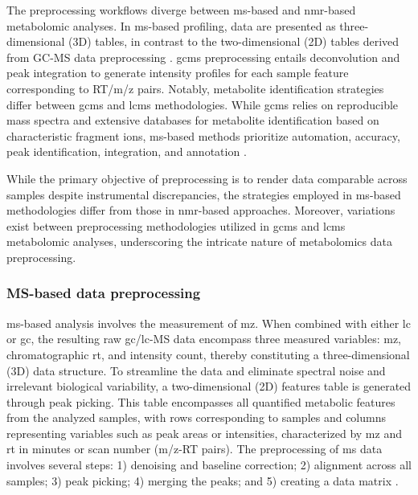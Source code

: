 \documentclass[ENG, BIB]{TFUOC}%
\begin{document}
The preprocessing workflows diverge between \gls{ms}-based and \gls{nmr}-based metabolomic analyses. In \gls{ms}-based profiling, data are presented as three-dimensional (3D) tables, in contrast to the two-dimensional (2D) tables derived from GC-MS data preprocessing \cite{sunPretreatingNormalizingMetabolomics2024,stanstrupMetaRbolomicsToolboxBioconductor2019}. \gls{gcms} preprocessing entails deconvolution and peak integration to generate intensity profiles for each sample feature corresponding to {RT/m/z} pairs. Notably, metabolite identification strategies differ between \gls{gcms} and \gls{lcms} methodologies. While \gls{gcms} relies on reproducible mass spectra and extensive databases for metabolite identification based on characteristic fragment ions, \gls{ms}-based methods prioritize automation, accuracy, peak identification, integration, and annotation \cite{xiaoMetaboliteIdentificationQuantitation2012,kiselevaDefiningBloodPlasma2021}.


While the primary objective of preprocessing is to render data comparable across samples despite instrumental discrepancies, the strategies employed in \gls{ms}-based methodologies differ from those in \gls{nmr}-based approaches. Moreover, variations exist between preprocessing methodologies utilized in \gls{gcms} and \gls{lcms} metabolomic analyses, underscoring the intricate nature of metabolomics data preprocessing.


\subsubsection{MS-based data preprocessing}

\gls{ms}-based analysis involves the measurement of \gls{mz}. When combined with either \gls{lc} or \gls{gc}, the resulting raw \gls{gc}/\gls{lc}-MS data encompass three measured variables: \gls{mz}, chromatographic \gls{rt}, and intensity count, thereby constituting a three-dimensional (3D) data structure.
To streamline the data and eliminate spectral noise and irrelevant biological variability, a two-dimensional (2D) features table is generated through peak picking. This table encompasses all quantified metabolic features from the analyzed samples, with rows corresponding to samples and columns representing variables such as peak areas or intensities, characterized by \gls{mz} and \gls{rt} in minutes or scan number (m/z-RT pairs).
The preprocessing of \gls{ms} data involves several steps: 1) denoising and baseline correction; 2) alignment across all samples; 3) peak picking; 4) merging the peaks; and 5) creating a data matrix \cite{chenGuideMetabolomicsAnalysis2022a,sunPretreatingNormalizingMetabolomics2024,xiaoMetaboliteIdentificationQuantitation2012, defernezChapterElevenStrategies2013,troisiChapterDataAnalysis2022,burtonInstrumentalExperimentalEffects2008,trygg01BackgroundEstimation2009,alonsoAnalyticalMethodsUntargeted2015,bloembergWarpingMethodsSpectroscopic2013}.
\end{document}
